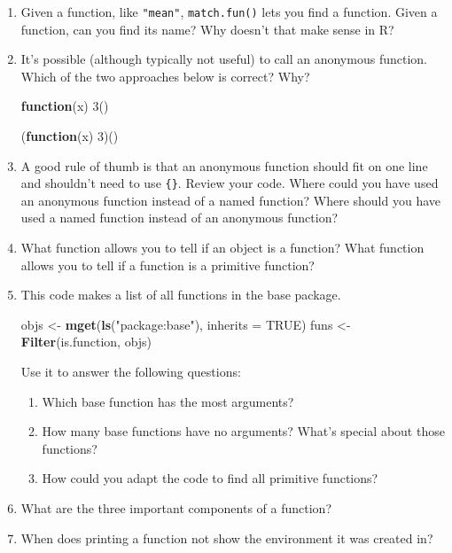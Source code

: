 \documentclass[]{book}
\newenvironment{Shaded}{\begin{snugshade}}{\end{snugshade}}
\newcommand{\KeywordTok}[1]{\textcolor[rgb]{0.13,0.29,0.53}{\textbf{#1}}}
\newcommand{\DataTypeTok}[1]{\textcolor[rgb]{0.13,0.29,0.53}{#1}}
\newcommand{\DecValTok}[1]{\textcolor[rgb]{0.00,0.00,0.81}{#1}}
\newcommand{\StringTok}[1]{\textcolor[rgb]{0.31,0.60,0.02}{#1}}
\newcommand{\OtherTok}[1]{\textcolor[rgb]{0.56,0.35,0.01}{#1}}
\newcommand{\ControlFlowTok}[1]{\textcolor[rgb]{0.13,0.29,0.53}{\textbf{#1}}}
\newcommand{\NormalTok}[1]{#1}
\theoremstyle{definition}
\theoremstyle{definition}
\theoremstyle{definition}
\theoremstyle{remark}
\begin{document}
\begin{enumerate}
\def\labelenumi{\arabic{enumi}.}
\item
  Given a function, like \texttt{"mean"}, \texttt{match.fun()} lets you
  find a function. Given a function, can you find its name? Why doesn't
  that make sense in R?
\item
  It's possible (although typically not useful) to call an anonymous
  function. Which of the two approaches below is correct? Why?

\begin{Shaded}
\begin{Highlighting}[]
\ControlFlowTok{function}\NormalTok{(x) }\DecValTok{3}\NormalTok{()}
\end{Highlighting}
\end{Shaded}

\begin{Shaded}
\begin{Highlighting}[]
\NormalTok{(}\ControlFlowTok{function}\NormalTok{(x) }\DecValTok{3}\NormalTok{)()}
\end{Highlighting}
\end{Shaded}
\item
  A good rule of thumb is that an anonymous function should fit on one
  line and shouldn't need to use \texttt{\{\}}. Review your code. Where
  could you have used an anonymous function instead of a named function?
  Where should you have used a named function instead of an anonymous
  function?
\item
  What function allows you to tell if an object is a function? What
  function allows you to tell if a function is a primitive function?
\item
  This code makes a list of all functions in the base package.

\begin{Shaded}
\begin{Highlighting}[]
\NormalTok{objs <-}\StringTok{ }\KeywordTok{mget}\NormalTok{(}\KeywordTok{ls}\NormalTok{(}\StringTok{"package:base"}\NormalTok{), }\DataTypeTok{inherits =} \OtherTok{TRUE}\NormalTok{)}
\NormalTok{funs <-}\StringTok{ }\KeywordTok{Filter}\NormalTok{(is.function, objs)}
\end{Highlighting}
\end{Shaded}

  Use it to answer the following questions:

  \begin{enumerate}
  \def\labelenumii{\alph{enumii}.}
  \item
    Which base function has the most arguments?
  \item
    How many base functions have no arguments? What's special about
    those functions?
  \item
    How could you adapt the code to find all primitive functions?
  \end{enumerate}
\item
  What are the three important components of a function?
\item
  When does printing a function not show the environment it was created
  in?
\end{enumerate}
\end{document}
